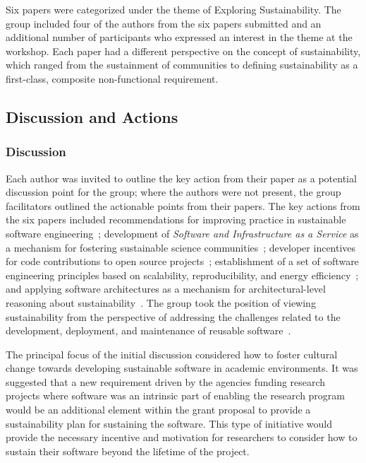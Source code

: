 \documentclass[11pt, oneside]{amsart}
\newcommand{\note}[1]{ {\textcolor{blueish}    { ***Note:      #1 }}}
\begin{document}

Six papers were categorized under the theme of Exploring Sustainability. The
group included four of the authors from the six papers submitted and an
additional number of participants who expressed an interest in the theme at the
workshop. Each paper had a different perspective on the concept of
sustainability, which ranged from the sustainment of communities to defining
sustainability as a first-class, composite non-functional requirement.

\subsection{Discussion and Actions}
\subsubsection{Discussion}

Each author was invited to outline the key action from their paper as a
potential discussion point for the group; where the authors were not present,
the group facilitators outlined the actionable points from their papers. The key
actions from the six papers included recommendations for improving practice in
sustainable software engineering~\cite{wssspe2_rosada_de_souza, wssspe2_downs};
development of \emph{Software and Infrastructure as a Service} as a mechanism for
fostering sustainable science communities~\cite{wssspe2_patra}; developer
incentives for code contributions to open source projects~\cite{wssspe2_pierce};
establishment of a set of software engineering principles based on scalability,
reproducibility, and energy efficiency~\cite{wssspe2_shi}; and applying software
architectures as a mechanism for architectural-level reasoning about
sustainability~\cite{wssspe2_venters}. The group took the position of viewing
sustainability from the perspective of addressing the challenges related to the
development, deployment, and maintenance of reusable
software~\cite{WSSSPE1}. 

The principal focus of the initial discussion
considered how to foster cultural change towards developing sustainable software
in academic environments. It was suggested that a new requirement driven by the
agencies funding research projects where software was an intrinsic part of
enabling the research program would be an additional element within the grant
proposal to provide a sustainability plan for sustaining the software. This type
of initiative would provide the necessary incentive and motivation for
researchers to consider how to sustain their software beyond the lifetime of the
project.
\end{document}
